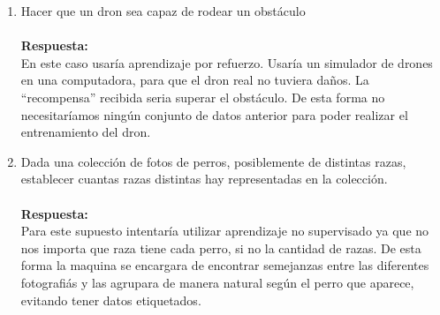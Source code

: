 \documentclass[12pt,a4paper]{article}
\begin{document}
\begin{enumerate}
\begin{enumerate}
		\item Hacer que un dron sea capaz de rodear un obstáculo\\\\		\textbf{Respuesta:}\\
		En este caso usaría aprendizaje por refuerzo. Usaría un simulador de drones en una computadora, para que el dron real no tuviera daños. La ``recompensa'' recibida seria superar el obstáculo. De esta forma no necesitaríamos ningún conjunto de datos anterior para poder realizar el entrenamiento del dron.
		
		\item Dada una colección de fotos de perros, posiblemente de distintas razas, establecer cuantas razas distintas hay representadas en la colección.\\\\		\textbf{Respuesta:}\\
		Para este supuesto intentaría utilizar aprendizaje no supervisado ya que no nos importa  que raza tiene cada perro, si no la cantidad de razas. De esta forma la maquina se encargara de encontrar semejanzas entre las diferentes fotografiás y las agrupara de manera natural según el perro que aparece, evitando tener datos etiquetados.
	\end{enumerate}



\end{enumerate}
\end{document}
